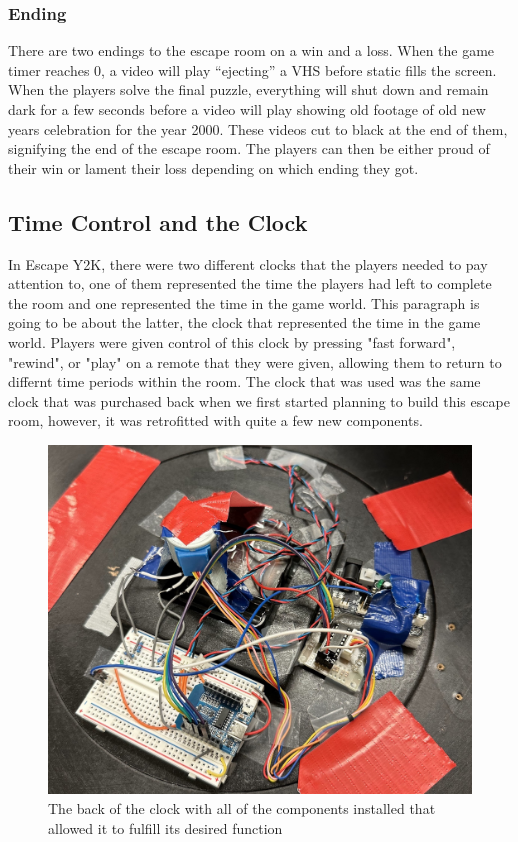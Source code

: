 \documentclass[conference]{IEEEtran}
\begin{document}
\subsubsection{Ending}

\indent There are two endings to the escape room on a win and a loss. When the game timer reaches 0, a video will play ``ejecting'' a VHS before static
fills the screen. When the players solve the final puzzle, everything will shut down and remain dark for a few seconds before a video will play showing old
footage of old new years celebration for the year 2000. These videos cut to black at the end of them, signifying the end of the escape room. The players can
then be either proud of their win or lament their loss depending on which ending they got. 

\subsection{Time Control and the Clock} %
In Escape Y2K, there were two different clocks that the players needed to pay attention to, one of them represented the time the players had left to complete the room
and one represented the time in the game world. This paragraph is going to be about the latter, the clock that represented the time in the game world. Players were
given control of this clock by pressing "fast forward", "rewind", or "play" on a remote that they were given, allowing them to return to differnt time periods within
the room. The clock that was used was the same clock that was purchased back when we first started planning to build this escape room, however, it was retrofitted with quite a few new components.
\\
\begin{figure}[ht]
    \centering
    \includegraphics[width=0.90\columnwidth]{Images/back_of_clock.jpg}
    \caption{The back of the clock with all of the components installed that allowed it to fulfill its desired function}
    \label{fig:backClock}
\end{figure}
\end{document}
